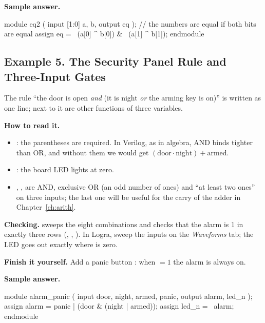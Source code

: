 \textbf{Sample answer.}\par\nopagebreak
\begin{vcode}
module eq2 (
    input  [1:0] a, b,
    output       eq
);
    // the numbers are equal if both bits are equal
    assign eq = ~(a[0] ^ b[0]) & ~(a[1] ^ b[1]);
endmodule
\end{vcode}

\subsection{Example 5. The Security Panel Rule and Three-Input Gates}

The rule ``the door is open \emph{and} (it is night \emph{or} the arming key is
on)'' is written as one line; next to it are other functions of three
variables.


\textbf{How to read it.}
\begin{itemize}
  \item {}: the parentheses are required. In Verilog, as in algebra, AND binds tighter than OR, and without them we would get $(\text{door}\cdot\text{night}) + \text{armed}$.
  \item {}: the board LED lights at zero.
  \item {}, ,  are AND, exclusive OR (an odd number of ones) and ``at least two ones'' on three inputs; the last one will be useful for the carry of the adder in Chapter~\ref{ch:arith}.
\end{itemize}
\textbf{Checking.}  sweeps the eight combinations and
checks that the alarm is 1 in exactly three rows (, ,
). In Logra, sweep the inputs on the \emph{Waveforms} tab; the
 LED goes out exactly where  is zero.

\textbf{Finish it yourself.} Add a panic button : when 
$=1$ the alarm is always on.

\textbf{Sample answer.}\par\nopagebreak
\begin{vcode}
module alarm_panic (
    input  door, night, armed, panic,
    output alarm, led_n
);
    assign alarm = panic | (door & (night | armed));
    assign led_n = ~alarm;
endmodule
\end{vcode}

